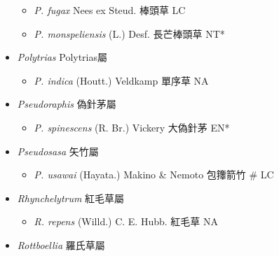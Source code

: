 \begin{itemize}
  \begin{itemize}
        \item[] \textit{P. fugax} Nees ex Steud.  棒頭草   LC
        \item[] \textit{P. monspeliensis} (L.) Desf.  長芒棒頭草   NT*
  \end{itemize}
 \item[] \textit{Polytrias} Polytrias屬
                                
  \begin{itemize}
        \item[] \textit{P. indica} (Houtt.) Veldkamp  單序草   NA
  \end{itemize}
 \item[] \textit{Pseudoraphis} 偽針茅屬
                                
  \begin{itemize}
        \item[] \textit{P. spinescens} (R. Br.) Vickery  大偽針茅   EN*
  \end{itemize}
 \item[] \textit{Pseudosasa} 矢竹屬
                                
  \begin{itemize}
        \item[] \textit{P. usawai} (Hayata.) Makino \& Nemoto  包籜箭竹  \# LC
  \end{itemize}
 \item[] \textit{Rhynchelytrum} 紅毛草屬
                                
  \begin{itemize}
        \item[] \textit{R. repens} (Willd.) C. E. Hubb.  紅毛草   NA
  \end{itemize}
 \item[] \textit{Rottboellia} 羅氏草屬
                                

\end{itemize}
